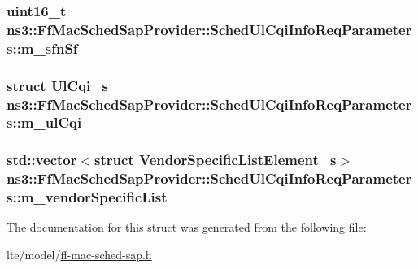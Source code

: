 \subsubsection[{\texorpdfstring{m\+\_\+sfn\+Sf}{m_sfnSf}}]{\setlength{\rightskip}{0pt plus 5cm}uint16\+\_\+t ns3\+::\+Ff\+Mac\+Sched\+Sap\+Provider\+::\+Sched\+Ul\+Cqi\+Info\+Req\+Parameters\+::m\+\_\+sfn\+Sf}\hypertarget{structns3_1_1FfMacSchedSapProvider_1_1SchedUlCqiInfoReqParameters_a03a5f4fe9abf48adf9428548bf11fac6}{}\label{structns3_1_1FfMacSchedSapProvider_1_1SchedUlCqiInfoReqParameters_a03a5f4fe9abf48adf9428548bf11fac6}
\subsubsection[{\texorpdfstring{m\+\_\+ul\+Cqi}{m_ulCqi}}]{\setlength{\rightskip}{0pt plus 5cm}struct {\bf Ul\+Cqi\+\_\+s} ns3\+::\+Ff\+Mac\+Sched\+Sap\+Provider\+::\+Sched\+Ul\+Cqi\+Info\+Req\+Parameters\+::m\+\_\+ul\+Cqi}\hypertarget{structns3_1_1FfMacSchedSapProvider_1_1SchedUlCqiInfoReqParameters_aef7a2eb9e8ee13b6032d708e55b60510}{}\label{structns3_1_1FfMacSchedSapProvider_1_1SchedUlCqiInfoReqParameters_aef7a2eb9e8ee13b6032d708e55b60510}
\subsubsection[{\texorpdfstring{m\+\_\+vendor\+Specific\+List}{m_vendorSpecificList}}]{\setlength{\rightskip}{0pt plus 5cm}std\+::vector$<$struct {\bf Vendor\+Specific\+List\+Element\+\_\+s}$>$ ns3\+::\+Ff\+Mac\+Sched\+Sap\+Provider\+::\+Sched\+Ul\+Cqi\+Info\+Req\+Parameters\+::m\+\_\+vendor\+Specific\+List}\hypertarget{structns3_1_1FfMacSchedSapProvider_1_1SchedUlCqiInfoReqParameters_a651e5be52736f332650ce53566a00727}{}\label{structns3_1_1FfMacSchedSapProvider_1_1SchedUlCqiInfoReqParameters_a651e5be52736f332650ce53566a00727}


The documentation for this struct was generated from the following file\+:\begin{DoxyCompactItemize}
\item 
lte/model/\hyperlink{ff-mac-sched-sap_8h}{ff-\/mac-\/sched-\/sap.\+h}\end{DoxyCompactItemize}
